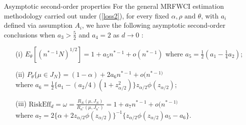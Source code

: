\documentclass [xcolor=svgnames, t] {beamer}
\begin{document}
\begin{frame}{Asymptotic second-order properties}
\vspace{5mm}
For the general MRFWCI estimation methodology carried out under (\ref{loss2}), for every 
fixed $\alpha, \rho \text{ and } \theta$, with $a_i$ defined 
via assumption $A_i$, we have the following asymptotic second-order conclusions 
when $a_3>\frac{5}{2}$ and $a_4=2$ as $d \xrightarrow{} 0$ :
\begin{enumerate}
\item[(i)] $E_{\theta}[(n^{*-1}N)^{1/2}]=1+a_5n^{*-1}+o(n^{*-1})$ where $a_5=\frac{1}{2}(a_1-\frac{1}{4}a_2)$;
\item[(ii)] $P_{\theta} \{ \mu \in J_N\} = (1-\alpha)+2a_6n^{*-1}+o(n^{*-1)}$\\
where $a_6=\frac{1}{2}\{ a_1-(a_2/4)(1+z^2_{\alpha/2}) \}z_{\alpha/2}\phi(z_{\alpha/2})$;
\item[(iii)] $\text{RiskEff}_d =\omega=\frac{R_N(\mu,J_N)}{R_{n^*}(\mu,J_{n^*})}= 1+ a_7 n^{*-1}+o(n^{*-1)}$ \\ 
where $a_7 = 2\{\alpha + 2z_{\alpha/2}\phi(z_{\alpha/2})\}^{-1} \{z_{\alpha/2}\phi(z_{\alpha/2})a_5-a_6\}$.
\end{enumerate}
 
\end{frame}

\end{document}
